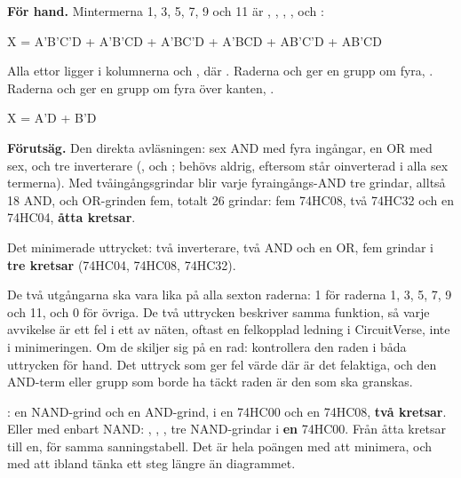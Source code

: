 \textbf{För hand.} Mintermerna 1, 3, 5, 7, 9 och 11 är , ,
, ,  och :

\begin{console}
X = A'B'C'D + A'B'CD + A'BC'D + A'BCD + AB'C'D + AB'CD
\end{console}


\noindent Alla ettor ligger i kolumnerna  och , där .
Raderna  och  ger en grupp om fyra, . Raderna  och 
ger en grupp om fyra över kanten, .

\begin{console}
X = A'D + B'D
\end{console}

\textbf{Förutsäg.} Den direkta avläsningen: sex AND med fyra ingångar, en OR med sex, och tre
inverterare (,  och ;  behövs aldrig, eftersom  står
oinverterad i alla sex termerna). Med tvåingångsgrindar blir varje fyraingångs-AND tre grindar,
alltså 18 AND, och OR-grinden fem, totalt 26 grindar: fem 74HC08, två 74HC32 och en 74HC04,
\textbf{åtta kretsar}.

Det minimerade uttrycket: två inverterare, två AND och en OR, fem grindar i \textbf{tre kretsar}
(74HC04, 74HC08, 74HC32).

De två utgångarna ska vara lika på alla sexton raderna: 1 för raderna 1, 3, 5, 7, 9
och 11, och 0 för övriga. De två uttrycken beskriver samma funktion, så varje avvikelse är ett fel i
ett av näten, oftast en felkopplad ledning i CircuitVerse, inte i minimeringen. Om de skiljer sig
på en rad: kontrollera den raden i båda uttrycken för hand. Det uttryck som ger fel värde där är det
felaktiga, och den AND-term eller grupp som borde ha täckt raden är den som ska granskas.

: en NAND-grind och en AND-grind, i en 74HC00 och en
74HC08, \textbf{två kretsar}. Eller med enbart NAND: , ,
, tre NAND-grindar i \textbf{en} 74HC00. Från åtta kretsar till en,
för samma sanningstabell. Det är hela poängen med att minimera, och med att ibland tänka ett steg
längre än diagrammet.

